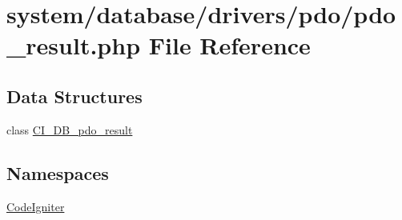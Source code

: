 \hypertarget{pdo__result_8php}{}\section{system/database/drivers/pdo/pdo\+\_\+result.php File Reference}
\label{pdo__result_8php}
\subsection*{Data Structures}
\begin{DoxyCompactItemize}
\item 
class \mbox{\hyperlink{class_c_i___d_b__pdo__result}{C\+I\+\_\+\+D\+B\+\_\+pdo\+\_\+result}}
\end{DoxyCompactItemize}
\subsection*{Namespaces}
\begin{DoxyCompactItemize}
\item 
 \mbox{\hyperlink{namespace_code_igniter}{Code\+Igniter}}
\end{DoxyCompactItemize}
